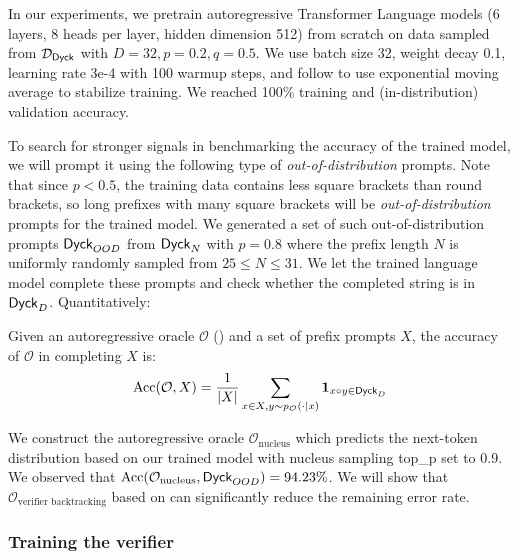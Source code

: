 In our experiments, we pretrain autoregressive Transformer \citep{vaswani2017attention} Language models 
(6 layers, 8 heads per layer, hidden dimension 512)
from scratch 
on data sampled from $\mathcal{D}_{\mathsf{Dyck}}$ 
with $D = 32, p = 0.2, q = 0.5$.
We use batch size 32, weight decay 0.1, learning rate 3e-4 with 100 warmup steps,
and follow \citet{block2024butterfly} to use exponential moving average to stabilize training.
We reached 100\% training and (in-distribution) validation accuracy.

To search for stronger signals in benchmarking the accuracy of the trained model,
we will prompt it using the following type of \emph{out-of-distribution} prompts.
Note that since $p < 0.5$, the training data contains less square brackets than round brackets,
so long prefixes with many square brackets will be \emph{out-of-distribution} prompts for the trained model.
We generated a set of such out-of-distribution prompts $\mathsf{Dyck}_{OOD}$ from $\mathsf{Dyck}_{N}$ with $p = 0.8$ where the prefix length $N$ is uniformly randomly sampled from $25 \le N \le 31$.
We let the trained language model complete these prompts and check whether the completed string is in $\mathsf{Dyck}_D$. 
Quantitatively:

\begin{definition}
    \label{def:acc}
    Given an autoregressive oracle $\mathcal{O}$ () 
    and a set of prefix prompts $X$,
    the accuracy of $\mathcal{O}$ in completing $X$ is:
    \begin{equation*}
        \text{Acc}(\mathcal{O}, X) = \frac{1}{\left| X \right|} \sum_{x \in X, y \sim p_{\mathcal{O}}(\cdot \mid x)} \bm{1}_{x \circ y \in \mathsf{Dyck}_D}  
    \end{equation*}
\end{definition}

We construct the autoregressive oracle $\mathcal{O}_{\text{nucleus}}$ 
which predicts the next-token distribution based on our trained model 
with nucleus sampling \citep{holtzman2020the} top\_p set to 0.9.
We observed that 
$\text{Acc}(\mathcal{O}_{\text{nucleus}}, \mathsf{Dyck}_{OOD}) = 94.23\%$.
We will show that $\mathcal{O}_{\text{verifier backtracking}}$ based on  can significantly reduce the remaining error rate.



\subsubsection{Training the verifier}
\label{sec:experiments:synthetic:verifier}

